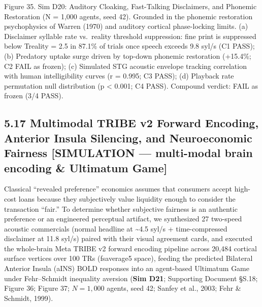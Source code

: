\documentclass[
]{article}
\begin{document}
Figure 35. Sim D20: Auditory Cloaking, Fast-Talking Disclaimers, and
Phonemic Restoration ({N = 1,000} agents, seed 42). Grounded in the
phonemic restoration psychophysics of Warren (1970) and auditory
cortical phase-locking limits. (a) Disclaimer syllable rate vs.~reality
threshold suppression: fine print is suppressed below {Treality = 2.5}
in 87.1\% of trials once speech exceeds 9.8 syl/s (C1 PASS); (b)
Predatory uptake surge driven by top-down phonemic restoration (+15.4\%;
C2 FAIL as frozen); (c) Simulated STG acoustic envelope tracking
correlation with human intelligibility curves ({r = 0.995}; C3 PASS);
(d) Playback rate permutation null distribution ({p \textless{} 0.001};
C4 PASS). Compound verdict: FAIL as frozen (3/4 PASS).

\subsection{5.17 Multimodal TRIBE v2 Forward Encoding, Anterior Insula
Silencing, and Neuroeconomic Fairness {[}SIMULATION --- multi-modal
brain encoding \& Ultimatum
Game{]}}\label{multimodal-tribe-v2-forward-encoding-anterior-insula-silencing-and-neuroeconomic-fairness-simulation-multi-modal-brain-encoding-ultimatum-game}

Classical ``revealed preference'' economics assumes that consumers
accept high-cost loans because they subjectively value liquidity enough
to consider the transaction ``fair.'' To determine whether subjective
fairness is an authentic preference or an engineered perceptual
artifact, we synthesized 27 two-speed acoustic commercials (normal
headline at \textasciitilde4.5 syl/s + time-compressed disclaimer at
11.8 syl/s) paired with their visual agreement cards, and executed the
whole-brain Meta TRIBE v2 forward encoding pipeline across 20,484
cortical surface vertices over 100 TRs (fsaverage5 space), feeding the
predicted Bilateral Anterior Insula (aINS) BOLD responses into an
agent-based Ultimatum Game under Fehr--Schmidt inequality aversion
(\textbf{Sim D21}; Supporting Document §S.18; Figure 36; Figure 37;
\(N = 1,000\) agents, seed 42; Sanfey et al., 2003; Fehr \& Schmidt,
1999).
\end{document}
